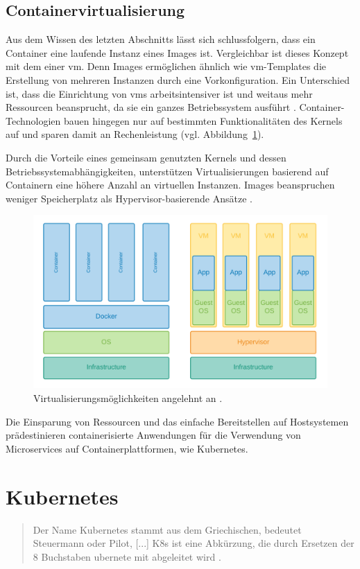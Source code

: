 \subsection{Containervirtualisierung}
Aus dem Wissen des letzten Abschnitts lässt sich schlussfolgern, dass
ein Container eine laufende Instanz eines Images ist.
Vergleichbar ist dieses Konzept mit dem einer \acs{vm}.
Denn Images ermöglichen ähnlich wie \acs{vm}-Templates die Erstellung von mehreren Instanzen durch eine Vorkonfiguration.
Ein Unterschied ist, dass die Einrichtung von \acs{vm}s arbeitsintensiver ist und weitaus mehr Ressourcen
beansprucht, da sie ein ganzes Betriebssystem ausführt \cite{hypervisorcontainer}. Container-Technologien bauen hingegen nur auf 
bestimmten Funktionalitäten des Kernels auf und sparen damit an Rechenleistung (vgl. Abbildung~\ref{fig:containervm}).

Durch die Vorteile eines gemeinsam genutzten Kernels und dessen Betriebssystemabhängigkeiten,
unterstützen Virtualisierungen basierend auf Containern eine höhere Anzahl an 
virtuellen Instanzen. Images beanspruchen weniger Speicherplatz als Hypervisor-basierende Ansätze \cite{hypervisorcontainer}.

\begin{figure}
    \centering
    \includegraphics[width=1.0\columnwidth]{images/Container-VM.png}
    \caption{Virtualisierungsmöglichkeiten angelehnt an \protect\cite{containervsvm}.}
    \label{fig:containervm}
\end{figure}

Die Einsparung von Ressourcen und das einfache Bereitstellen auf Hostsystemen
prädestinieren containerisierte Anwendungen für die Verwendung von Microservices
auf Containerplattformen, wie Kubernetes.


\section{Kubernetes}
\begin{quote}
  \glqq Der Name Kubernetes stammt aus dem Griechischen, bedeutet Steuermann oder Pilot, [...]
K8s ist eine Abkürzung, die durch Ersetzen der 8 Buchstaben \dq ubernete\dq{} mit \dq{} abgeleitet wird\grqq{} \cite{kubernetes}.
\end{quote}



